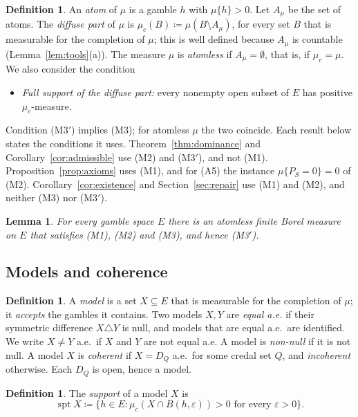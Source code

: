 \documentclass[11pt]{article}
\DeclareMathOperator{\spt}{spt}
\theoremstyle{plain}
\newtheorem{lemma}[theorem]{Lemma}
\theoremstyle{definition}
\newtheorem{definition}[theorem]{Definition}
\theoremstyle{remark}
\begin{document}
\begin{definition}\label{def:atoms}
An \emph{atom} of $\mu$ is a gamble $h$ with $\mu\{h\}>0$. Let $A_\mu$ be the set of atoms. The
\emph{diffuse part} of $\mu$ is $\mu_c(B)\coloneqq\mu(B\setminus A_\mu)$, for every set $B$
that is measurable for the completion of $\mu$; this is well defined because $A_\mu$ is
countable (Lemma~\ref{lem:tools}(a)). The measure $\mu$ is \emph{atomless} if
$A_\mu=\emptyset$, that is, if $\mu_c=\mu$. We also consider the condition
\begin{itemize}
  \item[(M3$'$)] \emph{Full support of the diffuse part:} every nonempty open subset of $E$ has
  positive $\mu_c$-measure.
\end{itemize}
Condition (M3$'$) implies (M3); for atomless $\mu$ the two coincide. Each result below states
the conditions it uses. Theorem~\ref{thm:dominance} and Corollary~\ref{cor:admissible} use
(M2) and (M3$'$), and not (M1). Proposition~\ref{prop:axioms} uses (M1), and for (A5) the
instance $\mu\{P_S=0\}=0$ of (M2). Corollary~\ref{cor:existence} and Section~\ref{sec:repair}
use (M1) and (M2), and neither (M3) nor (M3$'$).
\end{definition}

\begin{lemma}\label{lem:measure}
For every gamble space $E$ there is an atomless finite Borel measure on $E$ that satisfies
(M1), (M2) and (M3), and hence (M3$'$).
\end{lemma}

\subsection{Models and coherence}

\begin{definition}\label{def:models}
A \emph{model} is a set $X\subseteq E$ that is measurable for the completion of $\mu$; it
\emph{accepts} the gambles it contains. Two models $X,Y$ are \emph{equal a.e.} if their symmetric
difference $X\triangle Y$ is null, and models that are equal a.e.\ are identified. We write
$X\ne Y$ a.e.\ if $X$ and $Y$ are not equal a.e. A model is \emph{non-null} if it is not null. A model $X$ is
\emph{coherent} if $X=D_Q$ a.e.\ for some credal set $Q$, and \emph{incoherent} otherwise.
Each $D_Q$ is open, hence a model.
\end{definition}

\begin{definition}\label{def:spt}
The \emph{support} of a model $X$ is
\[
  \spt X\coloneqq\{h\in E:\mu_c(X\cap B(h,\varepsilon))>0\text{ for every }\varepsilon>0\}.
\]
\end{definition}
\end{document}
